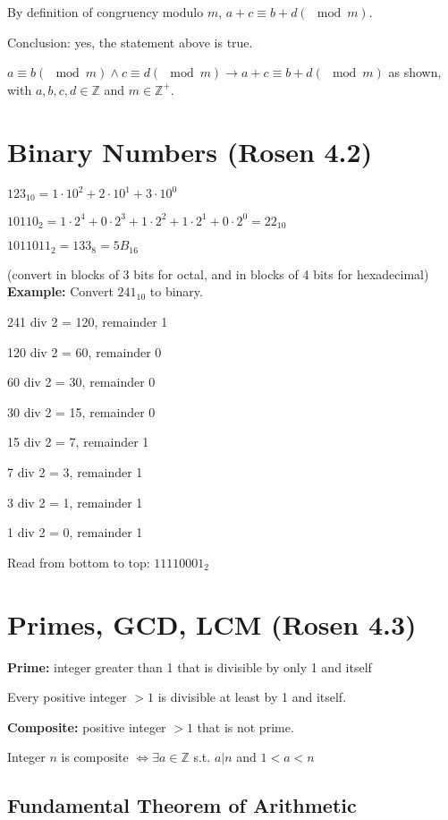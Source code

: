 \documentclass[english,openany]{book}
\begin{document}
    By definition of congruency modulo $m$, $a + c \equiv b + d (\mod m)$.

    Conclusion: yes, the statement above is true.

    $a \equiv b (\mod m) \wedge c \equiv d (\mod m) \rightarrow a + c \equiv b + d (\mod m)$ as shown, with $a,b,c,d \in \mathbb Z$ and $m \in \mathbb Z^+$.

    \section{Binary Numbers (Rosen 4.2)}

    $123_{10} = 1 \cdot 10^2 + 2 \cdot 10^1 + 3 \cdot 10^0$

    $10110_2 = 1 \cdot 2^4 + 0 \cdot 2^3 + 1 \cdot 2^2 + 1 \cdot 2^1 + 0 \cdot 2^0 = 22_{10}$


    $1011011_2 = 133_8 = 5B_{16}$

    (convert in blocks of 3 bits for octal, and in blocks of 4 bits for hexadecimal)\\

    \textbf{Example:} Convert $241_{10}$ to binary.

    241 div 2 = 120, remainder 1

    120 div 2 = 60, remainder 0

    60 div 2 = 30, remainder 0

    30 div 2 = 15, remainder 0

    15 div 2 = 7, remainder 1

    7 div 2 = 3, remainder 1

    3 div 2 = 1, remainder 1

    1 div 2 = 0, remainder 1

    Read from bottom to top: $11110001_2$

    \section{Primes, GCD, LCM (Rosen 4.3)}

    \textbf{Prime:} integer greater than 1 that is divisible by only 1 and itself

    Every positive integer $>1$ is divisible at least by 1 and itself.

    \textbf{Composite:} positive integer $>1$ that is not prime.

    Integer $n$ is composite $\iff \exists a \in \mathbb Z$ s.t. $a | n$ and $1 < a < n$

    \subsection{Fundamental Theorem of Arithmetic}
\end{document}
